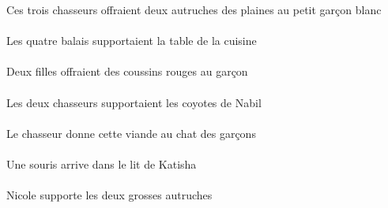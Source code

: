 \begin{exe}
Ces trois chasseurs offraient deux autruches des plaines au petit garçon blanc
\ex\gll
\DEFPlErg{}   \quatreCPl{}   \balaiCPlErg{}   \DEFSgAbs{}    \DEFSgObl{}   \cuisineCSgObl{}   \DE{}   \tableCSgAbs{}  \supporterVtPstCSg{}\\
\DEFPlErgP{}   \quatreCPlP{}   \balaiCPlErgP{}   \DEFSgAbsP{}    \DEFSgOblP{}   \cuisineCSgOblP{}   \DEP{}   \tableCSgAbsP{}  \supporterVtPstCSgP{}\\
Les quatre balais supportaient la table de la cuisine
\ex\gll
\INDDuErg{}   \filleCDuErg{}    \DEFSgDat{}   \garconBSgDat{}   \INDPlAbs{}   \rougeAPl{}   \coussinAPlAbs{}  \offrirVdPstAPl{}\\
\INDDuErgP{}   \filleCDuErgP{}    \DEFSgDatP{}   \garconBSgDatP{}   \INDPlAbsP{}   \rougeAPlP{}   \coussinAPlAbsP{}  \offrirVdPstAPlP{}\\
Deux filles offraient des coussins rouges au garçon
\ex\gll
\DEFDuErg{}   \chasseurCDuErg{}   \DEFPlAbs{}    \INDSgObl{}   \NabilBSgObl{}   \DE{}   \coyoteAPlAbs{}  \supporterVtPstAPl{}\\
\DEFDuErgP{}   \chasseurCDuErgP{}   \DEFPlAbsP{}    \INDSgOblP{}   \NabilBSgOblP{}   \DEP{}   \coyoteAPlAbsP{}  \supporterVtPstAPlP{}\\
Les deux chasseurs supportaient les coyotes de Nabil
\ex\gll
\DEFSgErg{}   \chasseurCSgErg{}    \DEFSgDat{}    \DEFPlObl{}   \garconBPlObl{}   \DE{}   \chatDSgDat{}   \DEMSgAbs{}   \viandeASgAbs{}  \donnerVdPrsASg{}\\
\DEFSgErgP{}   \chasseurCSgErgP{}    \DEFSgDatP{}    \DEFPlOblP{}   \garconBPlOblP{}   \DEP{}   \chatDSgDatP{}   \DEMSgAbsP{}   \viandeASgAbsP{}  \donnerVdPrsASgP{}\\
Le chasseur donne cette viande au chat des garçons
\ex\gll
\INDSgAbs{}   \sourisASgAbs{}    \DEFSgObl{}    \INDSgObl{}   \KatishaASgObl{}   \DE{}   \litDSgObl{}   \DANS{}  \arriverViPrsASg{}\\
\INDSgAbsP{}   \sourisASgAbsP{}    \DEFSgOblP{}    \INDSgOblP{}   \KatishaASgOblP{}   \DEP{}   \litDSgOblP{}   \DANSP{}  \arriverViPrsASgP{}\\
Une souris arrive dans le lit de Katisha
\ex\gll
\INDSgErg{}   \NicoleDSgErg{}   \DEFDuAbs{}   \grosDDu{}   \autrucheDDuAbs{}  \supporterVtPrsDDu{}\\
\INDSgErgP{}   \NicoleDSgErgP{}   \DEFDuAbsP{}   \grosDDuP{}   \autrucheDDuAbsP{}  \supporterVtPrsDDuP{}\\
Nicole supporte les deux grosses autruches
\ex\gll
\DEFSgObl{}   \cuisineCSgObl{}   \DANS{}   \INDDuErg{}   \maigreCDu{}   \chasseurCDuErg{}    \INDSgDat{}   \KatishaASgDat{}   \INDPlAbs{}   \jauneDPl{}   \oeufDPlAbs{}  \lancerVdPstDPl{}\\

\end{exe}
